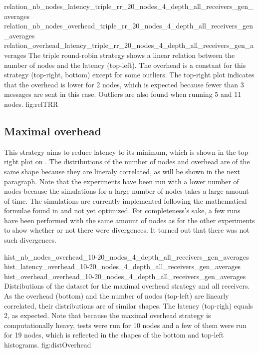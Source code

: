 \triplefigure
    {relation_nb_nodes_latency_triple_rr_20_nodes_4_depth_all_receivers_gen_averages}
    {relation_nb_nodes_overhead_triple_rr_20_nodes_4_depth_all_receivers_gen_averages}
    {relation_overhead_latency_triple_rr_20_nodes_4_depth_all_receivers_gen_averages}
    {The triple round-robin strategy shows a linear relation between the number of
    nodes and the latency (top-left). The overhead is a constant for this
    strategy (top-right, bottom) except for some outliers. The top-right plot
    indicates that the overhead is lower for 2 nodes, which is expected because
    fewer than 3 messages are sent in this case. Outliers are also found when
    running 5 and 11 nodes.}
    {fig:relTRR}

\FloatBarrier
\subsection{Maximal overhead}
This strategy aims to reduce latency to its minimum, which is shown in the
top-right plot on . The distributions of the number
of nodes and overhead are of the same shape because they are lineraly
correlated, as will be shown in the next paragraph. 
Note that the experiments have been run with a lower number of nodes because the
simulations for a large number of nodes takes a large amount of time. The
simulations are currently implemented following the mathematical formulae found
in \cite{abstractCBC} and not yet optimized. For completeness's sake, a few runs
have been performed with the same amount of nodes as for the other experiments
to show whether or not there were divergences. It turned out that there was not
such divergences. 

\triplefigure
    {hist_nb_nodes_overhead_10-20_nodes_4_depth_all_receivers_gen_averages}
    {hist_latency_overhead_10-20_nodes_4_depth_all_receivers_gen_averages}
    {hist_overhead_overhead_10-20_nodes_4_depth_all_receivers_gen_averages}
    {Distributions of the dataset for the maximal overhead strategy and all
    receivers. As the overhead (bottom) and the number of nodes (top-left) are
    linearly correlated, their distributions are of similar shapes. The
    latency (top-righ) equals 2, as expected. Note that because the maximal
    overhead strategy is computationally heavy, tests were run for 10 nodes and
    a few of them were run for 19 nodes, which is reflected in the shapes of the
    bottom and top-left histograms.}
    {fig:distOverhead}

